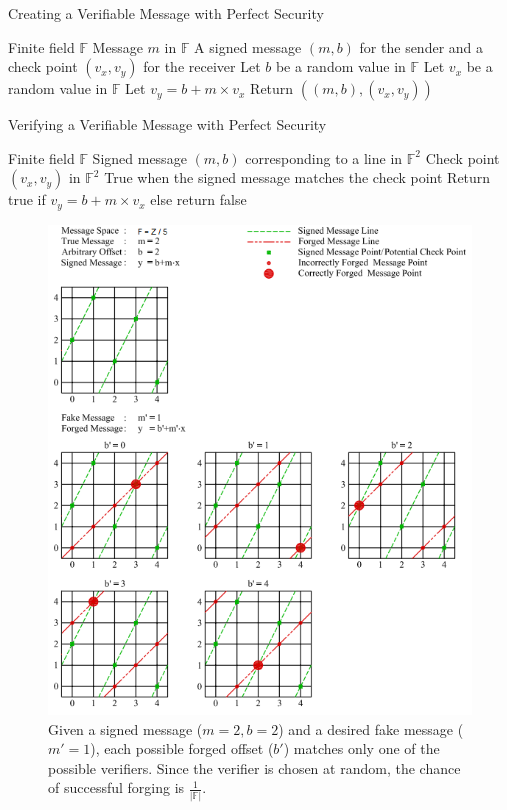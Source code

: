 \documentclass[12pt]{dalcsthesis}
\begin{document}
\begin{algorithm}
  \caption{Creating a Verifiable Message with Perfect Security}
  \label{alg:CreatingVerifiableMessageForUnbounded}
  \begin{algorithmic}
    \INPUT Finite field $\mathbb{F}$
    \INPUT Message $m$ in $\mathbb{F}$
    \OUTPUT A signed message $(m, b)$ for the sender and a check point $(v_x, v_y)$ for the receiver
    \STATE Let $b$ be a random value in $\mathbb{F}$ 
    \STATE Let $v_x$ be a random value in $\mathbb{F}$
    \STATE Let $v_y = b + m \times v_x$
    \STATE Return $((m, b), (v_x, v_y))$
  \end{algorithmic}
\end{algorithm}
\begin{algorithm}
  \caption{Verifying a Verifiable Message with Perfect Security}
  \label{alg:VerifyMessageForUnbounded}
  \begin{algorithmic}
    \INPUT Finite field $\mathbb{F}$
    \INPUT Signed message $(m, b)$ corresponding to a line in $\mathbb{F}^2$
    \INPUT Check point $(v_x, v_y)$ in $\mathbb{F}^2$
    \OUTPUT True when the signed message matches the check point
    \STATE Return true if $v_y = b + m \times v_x$ else return false
  \end{algorithmic}
\end{algorithm}

\begin{figure}
\includegraphics[width=\textwidth]{../../Graphics/PointAndLineExample.png}
\caption[Difficulty of forging a message]{Given a signed message ($m=2, b=2$) and a desired fake message ($m'=1$), each possible forged offset ($b'$) matches only one of the possible verifiers. Since the verifier is chosen at random, the chance of successful forging is $\frac{1}{|\mathbb{F}|}$.}
\label{img:ForgingVerifiableMessageForUnbounded}
\end{figure}
\end{document}
